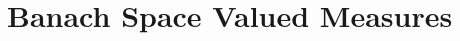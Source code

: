 \documentclass{book}
\begin{document}
	




















	
	
	
	
	
	
	
	
	\newpage
	\chapter{Banach Space Valued Measures}
	













































	\newpage
\end{document}
